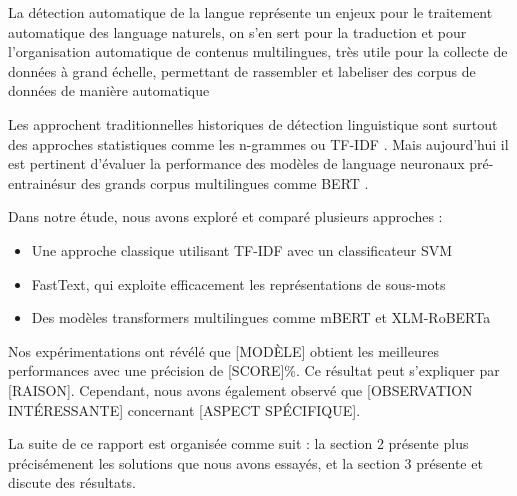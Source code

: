 
La détection automatique de la langue représente un enjeux pour le traitement automatique des language naturels, on s'en sert pour la traduction et pour l'organisation automatique de contenus multilingues, très utile pour la collecte de données à grand échelle, permettant de rassembler et labeliser des corpus de données de manière automatique

Les approchent traditionnelles historiques de détection linguistique sont surtout des approches statistiques comme les n-grammes \cite{cavnar1994n} ou TF-IDF \cite{baldwin2010language}. Mais aujourd'hui il est pertinent d'évaluer la performance des modèles de language neuronaux pré-entrainésur des grands corpus multilingues comme BERT \cite{devlin2019bert}.

Dans notre étude, nous avons exploré et comparé plusieurs approches :
\begin{itemize}
    \item Une approche classique utilisant TF-IDF avec un classificateur SVM
    \item FastText, qui exploite efficacement les représentations de sous-mots \cite{joulin2017bag}
    \item Des modèles transformers multilingues comme mBERT \cite{devlin2019bert} et XLM-RoBERTa \cite{conneau2020unsupervised}
\end{itemize}

Nos expérimentations ont révélé que [MODÈLE] obtient les meilleures performances avec une précision de [SCORE]\%. Ce résultat peut s'expliquer par [RAISON]. Cependant, nous avons également observé que [OBSERVATION INTÉRESSANTE] concernant [ASPECT SPÉCIFIQUE].

La suite de ce rapport est organisée comme suit : la section 2 présente plus précisémenent les solutions que nous avons essayés, et la section 3 présente et discute des résultats.

